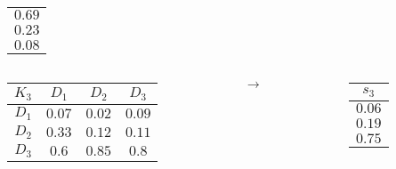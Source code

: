 \documentclass{beamer}
\begin{document}
\begin{frame}
\begin{columns}
\begin{column}{0.1\textwidth}
\begin{table}
\begin{tabular}{c}
				$0.69$\\
				$0.23$\\
				$0.08$
				\end{tabular}
			\end{table}
		\end{column}
	\end{columns}
	\begin{columns}
		\begin{column}{0.4\textwidth}
			\begin{table}
				\begin{tabular}{c|c|c|c}
				$K_3$	&	$D_1$	&	$D_2$	&	$D_3$\\ \hline
				$D_1$	&	$0.07$	&	$0.02$	&	$0.09$\\ \hline
				$D_2$	&	$0.33$	&	$0.12$	&	$0.11$\\ \hline
				$D_3$	&	$0.6$	&	$0.85$	&	$0.8$
				\end{tabular}
			\end{table}
		\end{column}
		\begin{column}{0.1\textwidth}
			$\rightarrow$
		\end{column}
		\begin{column}{0.1\textwidth}
			\begin{table}
				\begin{tabular}{c}
				$s_3$\\ \hline
				$0.06$\\
				$0.19$\\
				$0.75$
				\end{tabular}
			\end{table}
		\end{column}
	\end{columns}
\end{frame}
\end{document}
